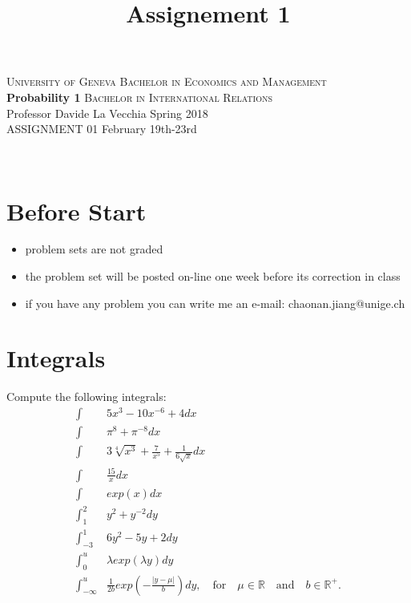 \documentclass[12pt,a4paper,titlepage]{article}
\title{Assignement 1}
\begin{document}
\noindent \textsc{University of Geneva}     \hfill \textsc{Bachelor in Economics and Management} \\
\textbf{Probability 1}                      \hfill \textsc{Bachelor in International Relations} \\
Professor Davide La Vecchia                 \hfill Spring 2018  \\
ASSIGNMENT 01                               \hfill   February 19th-23rd

\noindent
\makebox[\linewidth]{\rule{\textwidth}{0.4pt}}\\[1.5ex]
\section*{Before Start}
\begin{itemize}
\item problem sets are not graded
\item the problem set will be posted on-line one week before its correction in class
\item if you have any problem you can write me an e-mail: chaonan.jiang@unige.ch 
\end{itemize}






\section{Integrals}


Compute the following integrals: \\
\begin{align*}
\int& 5x^{3}-10x^{-6}+4 dx \\
\int&  \pi^{8}+\pi^{-8} dx \\
\int& 3\sqrt[4]{x^{3}}+\frac{7}{x^{5}}+\frac{1}{6\sqrt{x}}dx \\
\int& \frac{15}{x}dx \\
\int & exp(x)dx\\
\int_{1}^{2}& y^{2}+y^{-2}dy \\
\int_{-3}^{1}& 6y^{2}-5y+2dy \\
\int_{0}^{u}& \lambda exp(\lambda y) dy \\
\int_{-\infty}^{u}& \frac{1}{2b} exp\left (-\frac{|y-\mu|}{b}\right) dy, \quad \text{for} \quad \mu \in \mathbb{R} \quad \text{and} \quad b \in \mathbb{R}^{+}.
\end{align*}
\end{document}
